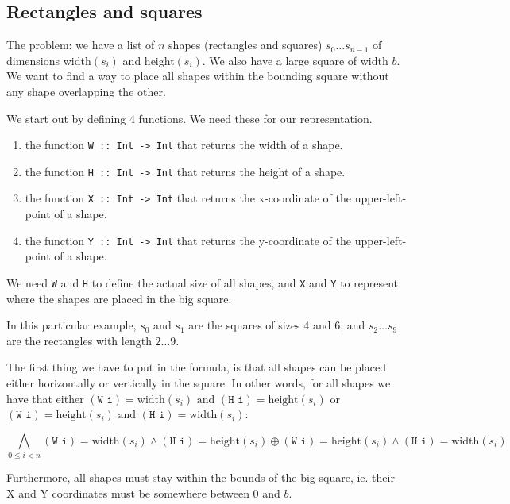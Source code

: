 \documentclass[12pt]{article}
\begin{document}
\subsection*{Rectangles and squares}
The problem: we have a list of $n$ shapes (rectangles and squares) 
$s_0\dots s_{n-1}$ of dimensions width$(s_i)$ and height$(s_i)$.
We also have a large square of width $b$.%
We want to find a way to place all shapes within the bounding square 
without any shape overlapping the other.

We start out by defining 4 functions. 
We need these for our representation.

\begin{enumerate}
\item the function \texttt{W :: Int -> Int} that returns the width of a shape.
\item the function \texttt{H :: Int -> Int}  that returns the height of a shape.
\item the function \texttt{X :: Int -> Int} that returns the x-coordinate of the upper-left-point of a shape.
\item the function \texttt{Y :: Int -> Int} that returns the y-coordinate of the upper-left-point of a shape.
\end{enumerate}

We need \texttt{W} and \texttt{H} to define the actual size of all shapes,
and \texttt{X} and \texttt{Y} to represent where the shapes are placed in the big square.

In this particular example, $s_0$ and $s_1$ are the squares of sizes 4 and 6, and $s_2 \dots s_9$ are the rectangles with length $2 \dots 9$.

The first thing we have to put in the formula, is that all shapes can be placed either horizontally or vertically in the square.
In other words, for all shapes we have that either 
$(\texttt{W i}) = \text{width}(s_i) \text{~and~} (\texttt{H i}) = \text{height}(s_i)$ or 
$(\texttt{W i}) = \text{height}(s_i) \text{~and~} (\texttt{H i}) = \text{width}(s_i)$:

\[ \bigwedge_{0 \le i < n}
(\texttt{W i}) = \text{width}(s_i) \wedge (\texttt{H i}) = \text{height}(s_i) \oplus
(\texttt{W i}) = \text{height}(s_i) \wedge (\texttt{H i}) = \text{width}(s_i)
\]

Furthermore, all shapes must stay within the bounds of the big square, ie. their X and Y coordinates must be somewhere between 0 and $b$.
\end{document}
